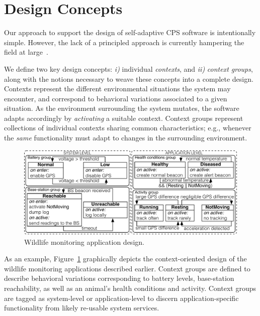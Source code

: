 \section{Design Concepts}
\label{sec:design}

Our approach to support the design of self-adaptive CPS software is
intentionally simple. However, the lack of a principled approach is
currently hampering the field at
large~\cite{Picco:2010:SEW:1882362.1882421}. %

We define two key design concepts: \emph{i)} individual
\emph{contexts}, and \emph{ii)} \emph{context groups}, along with the
notions necessary to weave these concepts into a complete design.
Contexts represent the different environmental situations the system
may encounter, and correspond to behavioral variations associated to a
given situation. As the environment surrounding the system mutates,
the software adapts accordingly by \emph{activating} a suitable
context. Context groups represent collections of individual contexts
sharing common characteristics; e.g., whenever the \emph{same}
functionality must adapt to changes in the surrounding environment.

\begin{figure}
\begin{center}
\includegraphics[scale=.45]{imgs/wildlifetracking}
\vspace{-4mm}
\caption{Wildlife monitoring application design.}
  \label{fig:design}
\vspace{-6mm}
\end{center}
\end{figure}

As an example, Figure~\ref{fig:design} graphically depicts the
context-oriented design of the wildlife monitoring applications
described earlier. Context groups are defined to describe behavioral
variations corresponding to battery levels, base-station reachability,
as well as an animal's health conditions and activity. Context groups
are tagged as system-level or application-level to discern
application-specific functionality from likely re-usable system
services.


